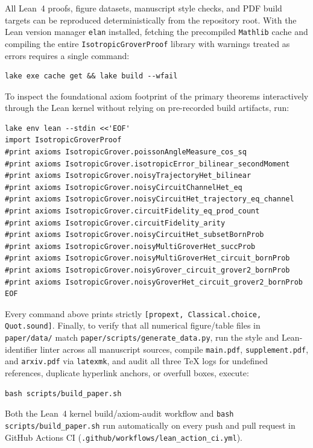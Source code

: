 All Lean~4 proofs, figure datasets, manuscript style checks, and PDF build targets can be reproduced deterministically from the repository root. With the Lean version manager \texttt{elan} installed, fetching the precompiled \texttt{Mathlib} cache and compiling the entire \texttt{IsotropicGroverProof} library with warnings treated as errors requires a single command:
\begin{verbatim}
lake exe cache get && lake build --wfail
\end{verbatim}
To inspect the foundational axiom footprint of the primary theorems interactively through the Lean kernel without relying on pre-recorded build artifacts, run:
\begin{verbatim}
lake env lean --stdin <<'EOF'
import IsotropicGroverProof
#print axioms IsotropicGrover.poissonAngleMeasure_cos_sq
#print axioms IsotropicGrover.isotropicError_bilinear_secondMoment
#print axioms IsotropicGrover.noisyTrajectoryHet_bilinear
#print axioms IsotropicGrover.noisyCircuitChannelHet_eq
#print axioms IsotropicGrover.noisyCircuitHet_trajectory_eq_channel
#print axioms IsotropicGrover.circuitFidelity_eq_prod_count
#print axioms IsotropicGrover.circuitFidelity_arity
#print axioms IsotropicGrover.noisyCircuitHet_subsetBornProb
#print axioms IsotropicGrover.noisyMultiGroverHet_succProb
#print axioms IsotropicGrover.noisyMultiGroverHet_circuit_bornProb
#print axioms IsotropicGrover.noisyGrover_circuit_grover2_bornProb
#print axioms IsotropicGrover.noisyGroverHet_circuit_grover2_bornProb
EOF
\end{verbatim}
Every command above prints strictly \texttt{[propext, Classical.choice, Quot.sound]}. Finally, to verify that all numerical figure/table files in \texttt{paper/data/} match \texttt{paper/scripts/generate\_data.py}, run the style and Lean-identifier linter across all manuscript sources, compile \texttt{main.pdf}, \texttt{supplement.pdf}, and \texttt{arxiv.pdf} via \texttt{latexmk}, and audit all three TeX logs for undefined references, duplicate hyperlink anchors, or overfull boxes, execute:
\begin{verbatim}
bash scripts/build_paper.sh
\end{verbatim}
Both the Lean~4 kernel build/axiom-audit workflow and \texttt{bash scripts/build\_paper.sh} run automatically on every push and pull request in GitHub Actions CI (\texttt{.github/workflows/lean\_action\_ci.yml}).
